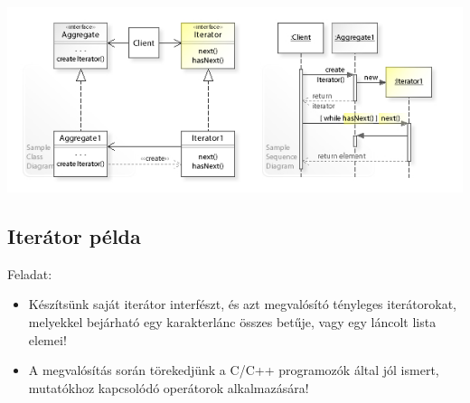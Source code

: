 \documentclass[usenames,dvipsnames,aspectratio=169]{beamer}
\begin{document}
\begin{frame}
    \begin{center}
        \includegraphics[width=\textwidth]{iterator.jpeg} \\
        \tiny {}
    \end{center}
\end{frame}

\subsection{Iterátor példa}

\begin{frame}
    Feladat:
    \begin{itemize}
        \item Készítsünk saját iterátor interfészt, és azt megvalósító tényleges iterátorokat, melyekkel bejárható egy karakterlánc összes betűje, vagy egy láncolt lista elemei!
        \item A megvalósítás során törekedjünk a C/C++ programozók által jól ismert, mutatókhoz kapcsolódó operátorok alkalmazására!
    \end{itemize}
\end{frame}
\end{document}
